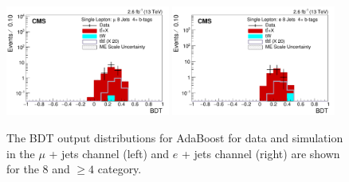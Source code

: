 \begin{figure}[ht!]
    \includegraphics[width=0.48\textwidth]{images/Run2/BDT_Mu29Aug400trees_5MinNodeSize_20nCuts_3MaxDepth_5adaboostbeta_adaBoost_alphaSTune_noMinEvents8nJets4nMtags_StackLogY.pdf}
    \includegraphics[width=0.48\textwidth]{images/Run2/BDT_El29Aug400trees_5MinNodeSize_20nCuts_3MaxDepth_5adaboostbeta_adaBoost_alphaSTune_noMinEvents8nJets4nMtags_StackLogY.pdf}
    \caption{The BDT output distributions for AdaBoost for data and simulation in the $\mu$ + jets channel (left) and $e$ + jets channel (right) are shown for the 8 \njets and $\geq4$ \nMtags category.}
    \label{fig:BDT_Mu29Aug400trees_5MinNodeSize_20nCuts_3MaxDepth_5adaboostbeta_adaBoost_alphaSTune_noMinEvents84}
\end{figure}

